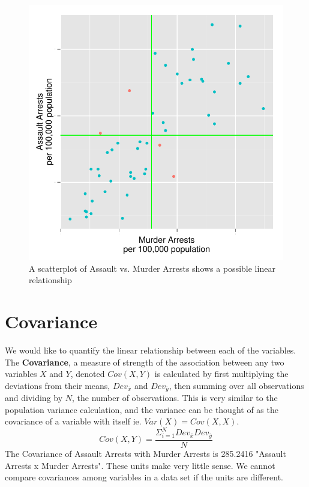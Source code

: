 \documentclass[nohyper,justified]{tufte-handout}\usepackage[]{graphicx}\usepackage[]{color}
\makeatletter
\def\maxwidth{ %
  \ifdim\Gin@nat@width>\linewidth
    \linewidth
  \else
    \Gin@nat@width
  \fi
}
\newenvironment{knitrout}{}{} %
\newcommand{\dev}[1] {Dev_{\bar{#1}}}
\makeatother
\begin{document}
\begin{knitrout}
\color{fgcolor}\begin{figure}

{\centering \includegraphics[width=\maxwidth]{figure/graphics-scatterplotsxy-1} 

}

\caption[A scatterplot of Assault vs]{A scatterplot of Assault vs. Murder Arrests shows a possible linear relationship}\label{fig:scatterplotsxy}
\end{figure}


\end{knitrout}
\section{Covariance}
We would like to quantify the linear relationship between each of the variables. The \textbf{Covariance}, a measure of strength of the association between any two variables $X$ and $Y$, denoted $Cov(X,Y)$ is calculated by first multiplying the deviations from their means, $\dev{x}$ and $\dev{y}$, then summing over all observations and dividing by $N$, the number of observations. This is very similar to the population variance calculation, and the variance can be thought of as the covariance of a variable with itself ie. $Var(X)=Cov(X,X)$. 
\begin{equation*}
Cov(X,Y)=\frac{\Sigma_{i=1}^{N} Dev_{\bar{x}}Dev_{\bar{y}}}{N}
\end{equation*}
The Covariance of Assault Arrests with Murder Arrests is 285.2416 "Assault Arrests x Murder Arrests". These units make very little sense. We cannot compare covariances among variables in a data set if the units are different.
\end{document}
